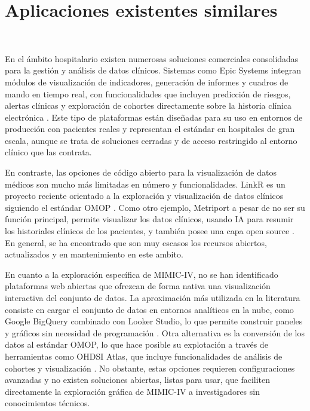 \newpage
\section{Aplicaciones existentes similares}\

En el ámbito hospitalario existen numerosas soluciones comerciales consolidadas para la gestión y análisis de datos clínicos. Sistemas como Epic Systems integran módulos de visualización de indicadores, generación de informes y cuadros de mando en tiempo real, con funcionalidades que incluyen predicción de riesgos, alertas clínicas y exploración de cohortes directamente sobre la historia clínica electrónica \cite{Epic}. Este tipo de plataformas están diseñadas para su uso en entornos de producción con pacientes reales y representan el estándar en hospitales de gran escala, aunque se trata de soluciones cerradas y de acceso restringido al entorno clínico que las contrata.

En contraste, las opciones de código abierto para la visualización de datos médicos son mucho más limitadas en número y funcionalidades. LinkR es un proyecto reciente orientado a la exploración y visualización de datos clínicos siguiendo el estándar OMOP \cite{linkR}. Como otro ejemplo, Metriport a pesar de no ser su función principal, permite visualizar los datos clínicos, usando IA para resumir los historiales clínicos de los pacientes, y también posee una capa open source \cite{metriport}. En general, se ha encontrado que son muy escasos los recursos abiertos, actualizados y en mantenimiento en este ambito.


En cuanto a la exploración específica de MIMIC-IV, no se han identificado plataformas web abiertas que ofrezcan de forma nativa una visualización interactiva del conjunto de datos. La aproximación más utilizada en la literatura consiste en cargar el conjunto de datos en entornos analíticos en la nube, como Google BigQuery combinado con Looker Studio, lo que permite construir paneles y gráficos sin necesidad de programación \cite{bigquery_mimic}. Otra alternativa es la conversión de los datos al estándar OMOP, lo que hace posible su explotación a través de herramientas como OHDSI Atlas, que incluye funcionalidades de análisis de cohortes y visualización \cite{OHDSI_Atlas, MIMICIV_OMOP_Demo}. No obstante, estas opciones requieren configuraciones avanzadas y no existen soluciones abiertas, listas para usar, que faciliten directamente la exploración gráfica de MIMIC-IV a investigadores sin conocimientos técnicos.




